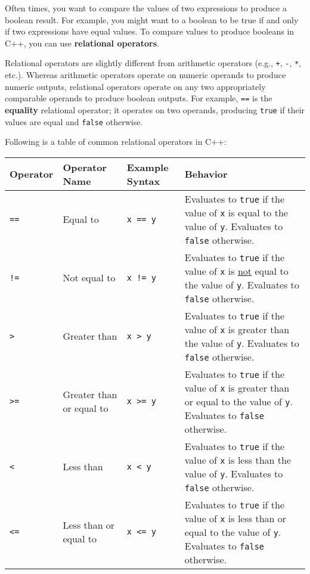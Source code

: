 \documentclass{article}
\begin{document}
Often times, you want to compare the values of two expressions to produce a boolean result. For example, you might want to a boolean to be true if and only if two expressions have equal values. To compare values to produce booleans in C++, you can use \textbf{relational operators}.

Relational operators are slightly different from arithmetic operators (e.g., \texttt{+}, \texttt{-}, \texttt{*}, etc.). Whereas arithmetic operators operate on numeric operands to produce numeric outputs, relational operators operate on any two appropriately comparable operands to produce boolean outputs. For example, \texttt{==} is the \textbf{equality} relational operator; it operates on two operands, producing \texttt{true} if their values are equal and \texttt{false} otherwise.

Following is a table of common relational operators in C++:

\begin{tabular}{|p{}|p{}|p{}|p{}|}
    \hline
    Operator & Operator Name & Example Syntax & Behavior \\
    \hline
    \texttt{==} & Equal to & \texttt{x == y} & Evaluates to \texttt{true} if the value of \texttt{x} is equal to the value of \texttt{y}. Evaluates to \texttt{false} otherwise. \\
    \hline
    \texttt{!=} & Not equal to & \texttt{x != y} & Evaluates to \texttt{true} if the value of \texttt{x} is \ul{not} equal to the value of \texttt{y}. Evaluates to \texttt{false} otherwise.\\
    \hline
    \texttt{>} & Greater than & \texttt{x > y} & Evaluates to \texttt{true} if the value of \texttt{x} is greater than the value of \texttt{y}. Evaluates to \texttt{false} otherwise.\\
    \hline
    \texttt{>=} & Greater than or equal to & \texttt{x >= y} & Evaluates to \texttt{true} if the value of \texttt{x} is greater than or equal to the value of \texttt{y}. Evaluates to \texttt{false} otherwise.\\
    \hline
    \texttt{<} & Less than & \texttt{x < y} & Evaluates to \texttt{true} if the value of \texttt{x} is less than the value of \texttt{y}. Evaluates to \texttt{false} otherwise.\\
    \hline
    \texttt{<=} & Less than or equal to & \texttt{x <= y} & Evaluates to \texttt{true} if the value of \texttt{x} is less than or equal to the value of \texttt{y}. Evaluates to \texttt{false} otherwise.\\
    \hline
\end{tabular}
\end{document}
